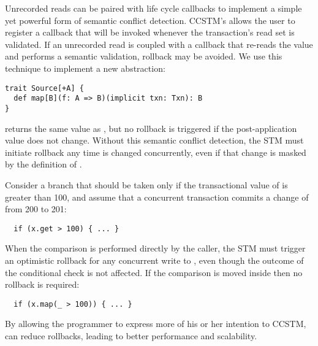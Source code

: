 Unrecorded reads can be paired with life cycle callbacks to implement a simple
yet powerful form of semantic conflict detection.  CCSTM's  allows the
user to register a callback that will be invoked whenever the transaction's read
set is validated.  If an unrecorded read is coupled with a callback that
re-reads the value and performs a semantic validation, rollback may be avoided.
We use this technique to implement a new abstraction:
\lstset{numbers=none}
\begin{lstlisting}
trait Source[+A] {
  def map[B](f: A => B)(implicit txn: Txn): B
}
\end{lstlisting}
\lstset{numbers=left}
 returns the same value as , but no rollback
is triggered if the post-application value does not change.  Without this
semantic conflict detection, the STM must initiate rollback any time 
is changed concurrently, even if that change is masked by the definition of
.

Consider a branch that should be taken only if the transactional value of
 is greater than 100, and assume that a concurrent transaction commits
a change of  from 200 to 201:
\lstset{numbers=none}
\begin{lstlisting}
  if (x.get > 100) { ... }
\end{lstlisting}
\lstset{numbers=left}
When the comparison is performed directly by the caller, the STM must
trigger an optimistic rollback for any concurrent write to , even
though
the outcome of the conditional check is not affected.  If the comparison is
moved inside  then no rollback is required:
\lstset{numbers=none}
\begin{lstlisting}
  if (x.map(_ > 100)) { ... }
\end{lstlisting}
\lstset{numbers=left}
By allowing the programmer to express more of his or her intention to CCSTM,
 can reduce rollbacks, leading to better performance and scalability.

